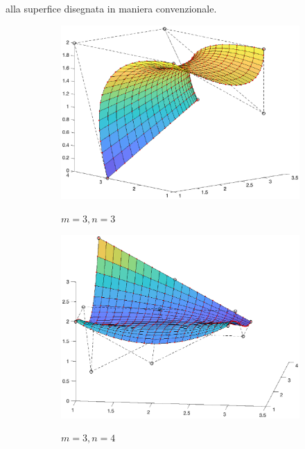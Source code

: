 \documentclass[a4paper, 12pt]{article}
\begin{document}
alla superfice disegnata in maniera convenzionale.
\begin{figure}[]
  \centering
  \begin{subfigure}[b]{0.6\textwidth}
    \includegraphics[width=\textwidth]{figure/surface_casteljau_m3n3.eps}
    \label{fig:surface_casteljau_m3n3}
    \caption{$m = 3, n = 3$}
  \end{subfigure}
  \begin{subfigure}[b]{0.6\textwidth}
      \includegraphics[width=\textwidth]{figure/surface_casteljau_m3n4.eps}
      \label{fig:surface_casteljau_m3n4}
      \caption{$m = 3, n = 4$}
  \end{subfigure}
  \begin{subfigure}[b]{0.6\textwidth}

\end{subfigure}
\end{figure}
\end{document}
